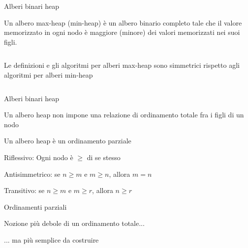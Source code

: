\begin{frame}{Alberi binari heap}

\vspace{-9pt}
\begin{myboxtitle}
Un \alert{albero max-heap} (\alert{min-heap}) è un albero binario 
completo tale che il valore memorizzato in ogni nodo è \alert{maggiore} (\alert{minore}) dei valori memorizzati nei suoi figli.
\end{myboxtitle}

\vspace{-6pt}
\begin{columns}[T]

\begin{myboxtitle}[Note]
Le definizioni e gli algoritmi per alberi max-heap sono simmetrici rispetto
agli algoritmi per alberi min-heap
\end{myboxtitle}

\vspace{-6pt}
\end{columns}

\end{frame}

\begin{frame}{Alberi binari heap}

\BIL
\item Un albero heap non impone una relazione di \alert{ordinamento totale} fra i figli di un nodo
\item Un albero heap è un \alert{ordinamento parziale}
  \BI
  \item \alert{Riflessivo}: Ogni nodo è $\geq$ di se stesso
  \item \alert{Antisimmetrico}: se $n \geq m$ e $m \geq n$, allora $m=n$
  \item \alert{Transitivo}: se $n \geq m$ e $m \geq r$, allora $n \geq r$
  \EI
\item Ordinamenti parziali
  \BI
  \item Nozione più debole di un ordinamento totale...
  \item ... ma più semplice da costruire
  \EI
\EIL

\end{frame}


